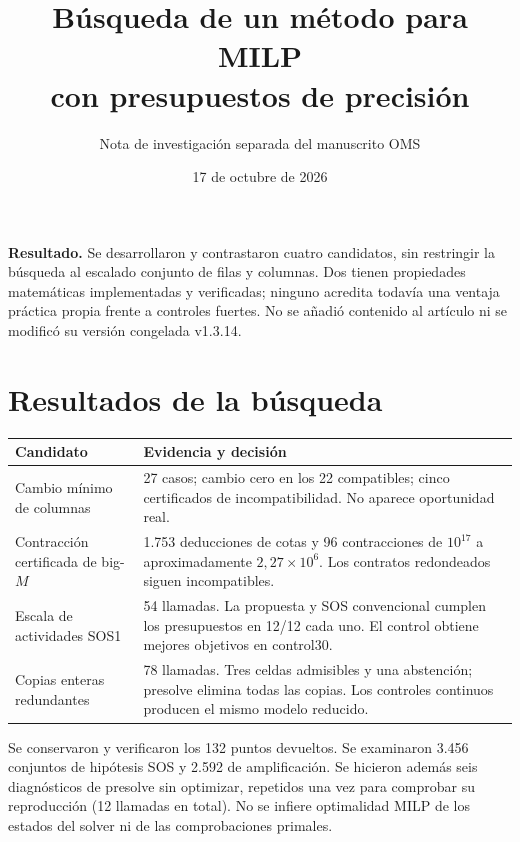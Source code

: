 \documentclass[10pt,a4paper]{article}
\title{Búsqueda de un método para MILP\\con presupuestos de precisión}
\author{Nota de investigación separada del manuscrito OMS}
\date{17 de octubre de 2026}
\begin{document}
\maketitle

\textbf{Resultado.} Se desarrollaron y contrastaron cuatro candidatos, sin
restringir la búsqueda al escalado conjunto de filas y columnas. Dos tienen
propiedades matemáticas implementadas y verificadas; ninguno acredita todavía
una ventaja práctica propia frente a controles fuertes. No se añadió contenido
al artículo ni se modificó su versión congelada v1.3.14.

\section*{Resultados de la búsqueda}
\begin{tabularx}{\textwidth}{@{}p{3.8cm}X@{}}
\toprule
Candidato & Evidencia y decisión\\\midrule
Cambio mínimo de columnas & 27 casos; cambio cero en los 22 compatibles;
cinco certificados de incompatibilidad. No aparece oportunidad real.\\
Contracción certificada de big-$M$ & 1.753 deducciones de cotas y 96
contracciones de $10^{17}$ a aproximadamente $2{,}27\times10^6$.
Los contratos redondeados siguen incompatibles.\\
Escala de actividades SOS1 & 54 llamadas. La propuesta y SOS convencional
cumplen los presupuestos en 12/12 cada uno. El control obtiene mejores
objetivos en control30.\\
Copias enteras redundantes & 78 llamadas. Tres celdas admisibles y una
abstención; presolve elimina todas las copias. Los controles continuos
producen el mismo modelo reducido.\\\bottomrule
\end{tabularx}

Se conservaron y verificaron los 132 puntos devueltos. Se examinaron 3.456
conjuntos de hipótesis SOS y 2.592 de amplificación. Se hicieron además seis
diagnósticos de presolve sin optimizar, repetidos una vez para comprobar su
reproducción (12 llamadas en total). No se infiere optimalidad MILP de los
estados del solver ni de las comprobaciones primales.
\end{document}
